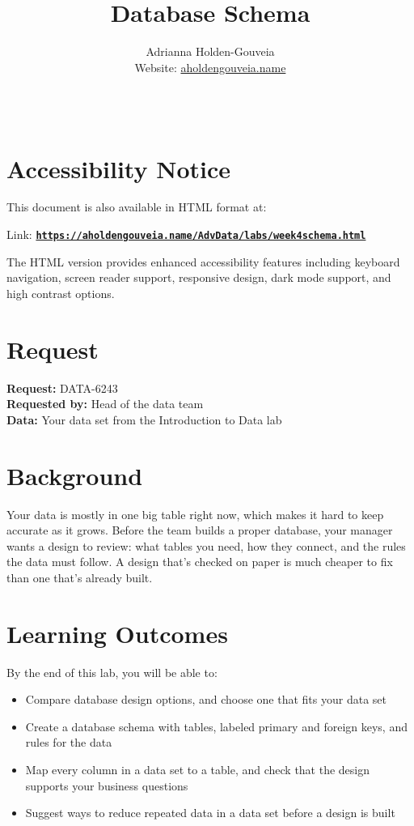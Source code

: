\documentclass[12pt]{article}
\title{Database Schema}
\author{
        Adrianna Holden-Gouveia \\
        Website: \href{https://aholdengouveia.name}{aholdengouveia.name}\\ 
        \date{\vspace{-5ex}}
        \faGithub {: aholdengouveia} \\
        }
\begin{document}
    

\maketitle



\section*{Accessibility Notice}
This document is also available in HTML format at:

Link: \href{https://aholdengouveia.name/AdvData/labs/week4schema.html}{\textbf{\nolinkurl{https://aholdengouveia.name/AdvData/labs/week4schema.html}}}

The HTML version provides enhanced accessibility features including keyboard navigation, screen reader support, responsive design, dark mode support, and high contrast options.

\section*{Request}
\noindent\textbf{Request:} DATA-6243\\
\textbf{Requested by:} Head of the data team\\
\textbf{Data:} Your data set from the Introduction to Data lab

\section*{Background}
Your data is mostly in one big table right now, which makes it hard to keep accurate as it grows. Before the team builds a proper database, your manager wants a design to review: what tables you need, how they connect, and the rules the data must follow. A design that's checked on paper is much cheaper to fix than one that's already built.

\section*{Learning Outcomes}
By the end of this lab, you will be able to:
\begin{itemize}
    \item Compare database design options, and choose one that fits your data set
    \item Create a database schema with tables, labeled primary and foreign keys, and rules for the data
    \item Map every column in a data set to a table, and check that the design supports your business questions
    \item Suggest ways to reduce repeated data in a data set before a design is built
\end{itemize}
\end{document}
